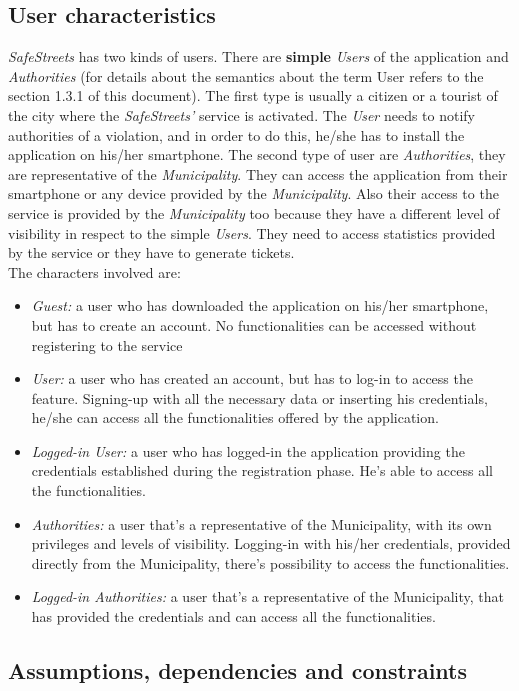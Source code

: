 \documentclass {article}
\begin{document}
	\subsection{User characteristics}
	{\it SafeStreets} has two kinds of users. There are  {\bf simple }{\it Users} of the application and {\it Authorities} (for details about the semantics about the term User refers to the section 1.3.1 of this document). The first type is usually a citizen or a tourist of the city where the {\it SafeStreets'} service is activated. The {\it User} needs to notify authorities of a violation,  and in order to do this, he/she has to install the application on his/her smartphone. The second type of user are {\it Authorities}, they are representative of the {\it Municipality}. They can access the application from their smartphone or any device provided by the {\it Municipality}. Also their access to the service is provided by the {\it Municipality} too because they have a different level of visibility in respect to the simple {\it Users}. They need to access statistics provided by the service or they have to generate tickets. \\
	The characters involved are:
	\begin{itemize}
		\item {\it Guest:} a user who has downloaded the application on his/her smartphone, but has to create an account. No functionalities can be accessed without registering to the service
		\item {\it User:} a user who has created an account, but has to log-in to access the feature. Signing-up with all the necessary data or inserting his credentials, he/she can access all the functionalities offered by the application.
		\item {\it Logged-in User:} a user who has logged-in the application providing the credentials established during the registration phase. He's able to access all the functionalities. 
		\item {\it Authorities:} a user that's a representative of the Municipality, with its own privileges and levels of visibility. Logging-in with his/her credentials, provided directly from the Municipality, there's possibility to access the functionalities.
		\item {\it Logged-in Authorities:} a user that's a representative of the Municipality, that has provided the credentials and can access all the functionalities.
	\end{itemize}
	\pagebreak
	
	\subsection{Assumptions, dependencies and constraints}
\end{document}

